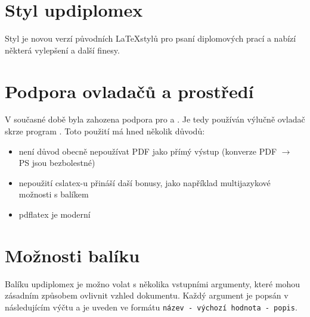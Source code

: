 \documentclass[a4paper,12pt]{article}
\begin{document}
\upmaketitle

\upthanksanot

\uptocandlists

\section{Styl updiplomex}
Styl  je novou verzí původních \LaTeX stylů pro psaní diplomových prací a nabízí některá vylepšení a další finesy.

\section{Podpora ovladačů a prostředí}
V současné době byla zahozena podpora pro  a . Je tedy používán výlučně  ovladač skrze program . Toto použití má hned několik důvodů:
\begin{itemize}
\item není důvod obecně nepoužívat PDF jako přímý výstup (konverze PDF $\rightarrow$ PS jsou bezbolestné)
\item nepoužití cslatex-u přináší daší bonusy, jako například multijazykové možnosti s balíkem 
\item pdflatex je moderní
\end{itemize}

\section{Možnosti balíku}
Balíku updiplomex je možno volat s několika vstupními argumenty, které mohou zásadním způsobem ovlivnit vzhled dokumentu. Každý argument je popsán v následujícím výčtu a je uveden ve formátu \verb|název - výchozí hodnota - popis|.
\end{document}
